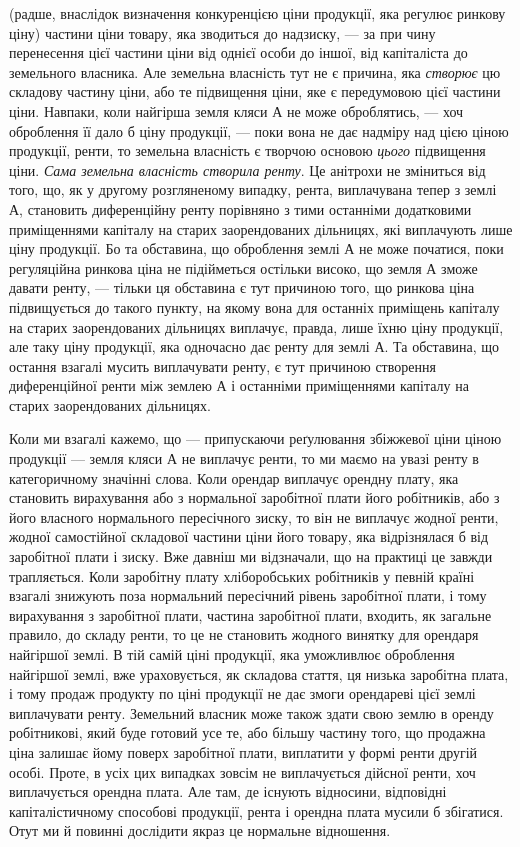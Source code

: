\parcont{}  %
(радше, внаслідок визначення конкуренцією ціни продукції, яка регулює ринкову
ціну) частини ціни товару, яка зводиться до надзиску, — за при чину перенесення
цієї частини ціни від однієї особи до іншої, від капіталіста до
земельного власника. Але земельна власність тут не є причина, яка \emph{створює}
цю складову частину ціни, або те підвищення ціни, яке є передумовою цієї
частини ціни. Навпаки, коли найгірша земля кляси А не може оброблятись, —
хоч оброблення її дало б ціну продукції, — поки вона не дає надміру над цією
ціною продукції, ренти, то земельна власність є творчою основою \emph{цього} підвищення
ціни. \emph{Сама земельна власність створила ренту}. Це анітрохи не
зміниться від того, що, як у другому розгляненому випадку, рента, виплачувана
тепер з землі А, становить диференційну ренту порівняно з тими останніми
додатковими приміщеннями капіталу на старих заорендованих дільницях, які
виплачують лише ціну продукції. Бо та обставина, що оброблення землі А
не може початися, поки регуляційна ринкова ціна не підійметься остільки високо,
що земля А зможе давати ренту, — тільки ця обставина є тут причиною
того, що ринкова ціна підвищується до такого пункту, на якому вона для
останніх приміщень капіталу на старих заорендованих дільницях виплачує,
правда, лише їхню ціну продукції, але таку ціну продукції, яка одночасно
дає ренту для землі А. Та обставина, що остання взагалі мусить виплачувати
ренту, є тут причиною створення диференційної ренти між землею А і останніми
приміщеннями капіталу на старих заорендованих дільницях.

Коли ми взагалі кажемо, що — припускаючи реґулювання збіжжевої ціни
ціною продукції — земля кляси А не виплачує ренти, то ми маємо на увазі
ренту в категоричному значінні слова. Коли орендар виплачує орендну плату,
яка становить вирахування або з нормальної заробітної плати його робітників,
або з його власного нормального пересічного зиску, то він не виплачує жодної
ренти, жодної самостійної складової частини ціни його товару, яка відрізнялася б
від заробітної плати і зиску. Вже давніш ми відзначали, що на практиці це
завжди трапляється. Коли заробітну плату хліборобських робітників у певній
країні взагалі знижують поза нормальний пересічний рівень заробітної плати,
і тому вирахування з заробітної плати, частина заробітної плати, входить, як
загальне правило, до складу ренти, то це не становить жодного винятку для
орендаря найгіршої землі. В тій самій ціні продукції, яка уможливлює оброблення
найгіршої землі, вже ураховується, як складова стаття, ця низька заробітна
плата, і тому продаж продукту по ціні продукції не дає змоги орендареві
цієї землі виплачувати ренту. Земельний власник може також здати свою землю
в оренду робітникові, який буде готовий усе те, або більшу частину того, що
продажна ціна залишає йому поверх заробітної плати, виплатити у формі
ренти другій особі. Проте, в усіх цих випадках зовсім не виплачується дійсної
ренти, хоч виплачується орендна плата. Але там, де існують відносини, відповідні
капіталістичному способові продукції, рента і орендна плата мусили б
збігатися. Отут ми й повинні дослідити якраз це нормальне відношення.

